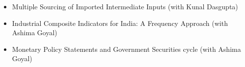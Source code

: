 %
%
%

\vspace{10pt}
\begin{itemize}
    \item Multiple Sourcing of Imported Intermediate Inputs (with Kunal Dasgupta)
    \item Industrial Composite Indicators for India: A Frequency Approach (with Ashima Goyal)
    \item Monetary Policy Statements and Government Securities cycle (with Ashima Goyal)
\end{itemize}